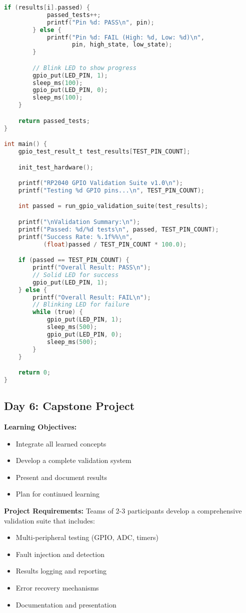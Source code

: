 \documentclass[11pt,a4paper]{article}
\begin{document}
\begin{lstlisting}[language=C, caption=Day 5 Example: GPIO Validation Test]
        if (results[i].passed) {
            passed_tests++;
            printf("Pin %d: PASS\n", pin);
        } else {
            printf("Pin %d: FAIL (High: %d, Low: %d)\n",
                   pin, high_state, low_state);
        }

        // Blink LED to show progress
        gpio_put(LED_PIN, 1);
        sleep_ms(100);
        gpio_put(LED_PIN, 0);
        sleep_ms(100);
    }

    return passed_tests;
}

int main() {
    gpio_test_result_t test_results[TEST_PIN_COUNT];

    init_test_hardware();

    printf("RP2040 GPIO Validation Suite v1.0\n");
    printf("Testing %d GPIO pins...\n", TEST_PIN_COUNT);

    int passed = run_gpio_validation_suite(test_results);

    printf("\nValidation Summary:\n");
    printf("Passed: %d/%d tests\n", passed, TEST_PIN_COUNT);
    printf("Success Rate: %.1f%%\n",
           (float)passed / TEST_PIN_COUNT * 100.0);

    if (passed == TEST_PIN_COUNT) {
        printf("Overall Result: PASS\n");
        // Solid LED for success
        gpio_put(LED_PIN, 1);
    } else {
        printf("Overall Result: FAIL\n");
        // Blinking LED for failure
        while (true) {
            gpio_put(LED_PIN, 1);
            sleep_ms(500);
            gpio_put(LED_PIN, 0);
            sleep_ms(500);
        }
    }

    return 0;
}
\end{lstlisting}

\subsection{Day 6: Capstone Project}

\textbf{Learning Objectives:}
\begin{itemize}
    \item Integrate all learned concepts
    \item Develop a complete validation system
    \item Present and document results
    \item Plan for continued learning
\end{itemize}

\textbf{Project Requirements:}
Teams of 2-3 participants develop a comprehensive validation suite that includes:
\begin{itemize}
    \item Multi-peripheral testing (GPIO, ADC, timers)
    \item Fault injection and detection
    \item Results logging and reporting
    \item Error recovery mechanisms
    \item Documentation and presentation
\end{itemize}
\end{document}
